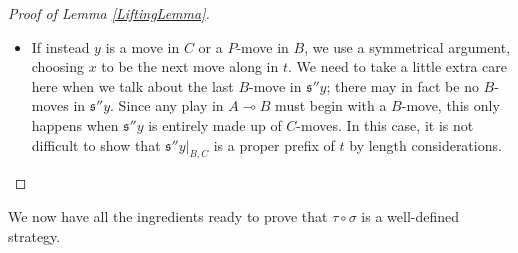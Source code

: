 \documentclass[11pt]{article} %
\theoremstyle{plain} %
\theoremstyle{definition} %
\theoremstyle{note}
\theoremstyle{exercisestyle}
\renewcommand{\implies}{\multimap}
\newcommand{\comp}[2]{#1 \circ #2}
\newcommand{\s}{\mathfrak s}
\newcommand{\prefix}{\sqsubseteq}
\begin{document}
\begin{proof}[Proof of Lemma \ref{LiftingLemma}]
\begin{itemize}
      If $y$ was an $O$-move in $A$, then $y$ is a $P$-move in $A\implies B$, so it must be followed in $A\implies B$ by another move from $A$.  Then the condition that $\s''yz\vert_A\prefix s\vert_A$ tells us that $z=x$.  If instead $y$ was a $P$-move in $A$ or a move in $B$ then $y$ is an $O$-move in $A\implies B$; now, since we have $\s''y\vert_{A,B}z,\s''y\vert_{A,B}x\in\sigma$, it must be the case that $x=z$ by the definition of a strategy.

    \item If instead $y$ is a move in $C$ or a $P$-move in $B$, we use a symmetrical argument, choosing $x$ to be the next move along in $t$.  We need to take a little extra care here when we talk about the last $B$-move in $\s''y$; there may in fact be no $B$-moves in $\s''y$.  Since any play in $A\implies B$ must begin with a $B$-move, this only happens when $\s''y$ is entirely made up of $C$-moves.  In this case, it is not difficult to show that $\s''y\vert_{B,C}$ is a proper prefix of $t$ by length considerations.  \qedhere
  \end{itemize}
\end{proof}

We now have all the ingredients ready to prove that $\comp\tau\sigma$ is a well-defined strategy.
\end{document}
